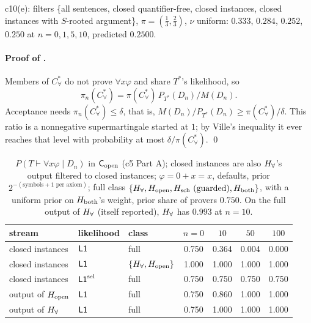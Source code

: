 c10(e): filters \{all sentences, closed quantifier-free, closed instances, closed instances with $S$-rooted argument\}, $\pi=(\tfrac13,\tfrac23)$, $\nu$ uniform: $0.333$, $0.284$, $0.252$, $0.250$ at $n=0,1,5,10$, predicted $0.2500$.

\paragraph{Proof of .} Members of $C^*_\forall$ do not prove $\forall x\varphi$ and share $T^*$'s likelihood, so
\[\pi_n(C^*_\forall)=\pi(C^*_\forall)\,P_{T^*}(D_n)/M(D_n).\]
Acceptance needs $\pi_n(C^*_\forall)\le\delta$, that is, $M(D_n)/P_{T^*}(D_n)\ge\pi(C^*_\forall)/\delta$. This ratio is a nonnegative supermartingale started at $1$; by Ville's inequality it ever reaches that level with probability at most $\delta/\pi(C^*_\forall)$. \qed

\begin{table}[ht]
\centering\small
\begin{tabular}{@{}lllcccc@{}}
\toprule
stream & likelihood & class & $n=0$ & $10$ & $50$ & $100$\\
\midrule
closed instances & $\mathord{\mathsf{L1}}$ & full & 0.750 & 0.364 & 0.004 & 0.000\\
closed instances & $\mathord{\mathsf{L1}}$ & $\{H_{\forall},H_{\mathrm{open}}\}$ & 1.000 & 1.000 & 1.000 & 1.000\\
closed instances & $\mathord{\mathsf{L1}}^{\mathrm{sel}}$ & full & 0.750 & 0.750 & 0.750 & 0.750\\
output of $H_{\mathrm{open}}$ & $\mathord{\mathsf{L1}}$ & full & 0.750 & 0.860 & 1.000 & 1.000\\
output of $H_{\forall}$ & $\mathord{\mathsf{L1}}$ & full & 0.750 & 1.000 & 1.000 & 1.000\\
\bottomrule
\end{tabular}
\caption{$P(T\vdash\forall x\varphi\mid D_n)$ in $\mathsf{C}_{\mathrm{open}}$ (c5 Part A); closed instances are also $H_{\forall}$'s output filtered to closed instances; $\varphi=0+x=x$, defaults, prior $2^{-(\text{symbols}+1\text{ per axiom})}$; full class $\{H_{\forall},H_{\mathrm{open}},H_{\mathrm{sch}}\text{ (guarded)},H_{\mathrm{both}}\}$, with a uniform prior on $H_{\mathrm{both}}$'s weight, prior share of provers $0.750$. On the full output of $H_{\forall}$ (itself reported), $H_{\forall}$ has $0.993$ at $n=10$.}
\label{tab:univ:c5}
\end{table}


